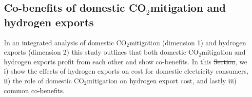 \documentclass[5p,numafflabel]{elsarticle}
\newcommand{\co}{\ce{CO2}~}
\def\co{CO${}_2${\:}}
\providecommand{\DIFaddtex}[1]{{\protect\color{blue}\uwave{#1}}} %
\providecommand{\DIFdeltex}[1]{{\protect\color{red}\sout{#1}}}                      %
\providecommand{\DIFaddbegin}{} %
\providecommand{\DIFaddend}{} %
\providecommand{\DIFdelbegin}{} %
\providecommand{\DIFdelend}{} %
\providecommand{\DIFadd}[1]{\texorpdfstring{\DIFaddtex{#1}}{#1}} %
\providecommand{\DIFdel}[1]{\texorpdfstring{\DIFdeltex{#1}}{}} %
\newcommand{\DIFscaledelfig}{0.5}
\newlength{\DIFdelgraphicswidth} %
\newlength{\DIFdelgraphicsheight} %
\newcommand{\DIFaddincludegraphics}[2][]{{\color{blue}\fbox{\DIFOincludegraphics[#1]{#2}}}} %
\newcommand{\DIFdelincludegraphics}[2][]{%
\sbox{\DIFdelgraphicsbox}{\DIFOincludegraphics[#1]{#2}}%
\settoboxwidth{\DIFdelgraphicswidth}{\DIFdelgraphicsbox} %
\settoboxtotalheight{\DIFdelgraphicsheight}{\DIFdelgraphicsbox} %
\scalebox{\DIFscaledelfig}{%
\parbox[b]{\DIFdelgraphicswidth}{\usebox{\DIFdelgraphicsbox}\\[-\baselineskip] \rule{\DIFdelgraphicswidth}{0em}}\llap{\resizebox{\DIFdelgraphicswidth}{\DIFdelgraphicsheight}{%
\setlength{\unitlength}{\DIFdelgraphicswidth}%
\begin{picture}(1,1)%
\thicklines\linethickness{2pt} %
{\color[rgb]{1,0,0}\put(0,0){\framebox(1,1){}}}%
{\color[rgb]{1,0,0}\put(0,0){\line( 1,1){1}}}%
{\color[rgb]{1,0,0}\put(0,1){\line(1,-1){1}}}%
\end{picture}%
}\hspace*{3pt}}} %
} %
\DeclareRobustCommand{\DIFaddbegin}{\DIFOaddbegin \let\includegraphics\DIFaddincludegraphics} %
\DeclareRobustCommand{\DIFaddend}{\DIFOaddend \let\includegraphics\DIFOincludegraphics} %
\DeclareRobustCommand{\DIFdelbegin}{\DIFOdelbegin \let\includegraphics\DIFdelincludegraphics} %
\DeclareRobustCommand{\DIFdelend}{\DIFOaddend \let\includegraphics\DIFOincludegraphics} %
\begin{document}
\subsection*{Co-benefits of domestic \co mitigation and hydrogen exports}
\label{subsec:benefits}

In an integrated analysis of domestic \co mitigation (dimension 1) and hydrogen exports (dimension 2) this study outlines that both domestic \co mitigation and hydrogen exports profit from each other and show co-benefits. In this \DIFdelbegin \DIFdel{Section}\DIFdelend \DIFaddbegin \DIFadd{section}\DIFaddend , we i) show the effects of hydrogen exports on cost for domestic electricity consumers, ii) the role of domestic \co mitigation on hydrogen export cost, and lastly iii) common co-benefits.
\end{document}
